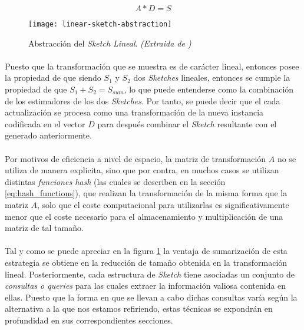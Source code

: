 \documentclass{subfiles}
\begin{document}
        \begin{equation}
        \label{eq:linear_sketch}
          A  * D = S
        \end{equation}

        \begin{figure}
          \centering
          \texttt{[image: linear-sketch-abstraction]}
          \caption{Abstracción del \emph{Sketch Lineal}. \emph{(Extraida de \cite{cormode2012synopses})}}
          \label{fig:linear_sketch}
        \end{figure}

        \paragraph{}
        Puesto que la transformación que se muestra es de carácter lineal, entonces posee la propiedad de que siendo $S_1$ y $S_2$ dos \emph{Sketches} lineales, entonces se cumple la propiedad de que $S_1 + S_2 = S_{sum}$, lo que puede entenderse como la combinación de los estimadores de los dos \emph{Sketches}. Por tanto, se puede decir que el cada actualización se procesa como una transformación de la nueva instancia codificada en el vector $D$ para después combinar el \emph{Sketch} resultante con el generado anteriormente.

        \paragraph{}
        Por motivos de eficiencia a nivel de espacio, la matriz de transformación $A$ no se utiliza de manera explicita, sino que por contra, en muchos casos se utilizan distintas \emph{funciones hash} (las cuales se describen en la sección \ref{eq:hash_functions}), que realizan la transformación de la misma forma que la matriz $A$, solo que el coste computacional para utilizarlas es significativamente menor que el coste necesario para el almacenamiento y multiplicación de una matriz de tal tamaño.

        \paragraph{}
        Tal y como se puede apreciar en la figura \ref{fig:linear_sketch} la ventaja de sumarización de esta estrategia se obtiene en la reducción de tamaño obtenida en la transformación lineal. Posteriormente, cada estructura de \emph{Sketch} tiene asociadas un conjunto de \emph{consultas o queries} para las cuales extraer la información valiosa contenida en ellas. Puesto que la forma en que se llevan a cabo dichas consultas varía según la alternativa a la que nos estamos refiriendo, estas técnicas se expondrán en profundidad en sus correspondientes secciones.
\end{document}
